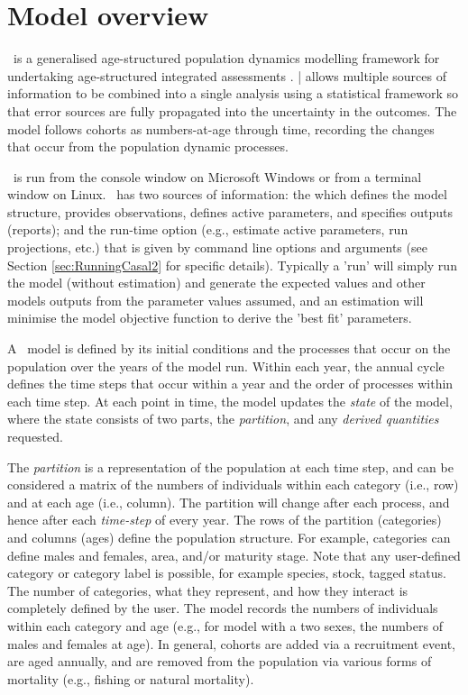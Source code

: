 \section{Model overview\label{sec:Overview}}

\CNAME\ is a generalised age-structured population dynamics modelling framework for undertaking age-structured integrated assessments \citep{Maunder_2013}. \CNAME| allows multiple sources of information to be combined into a single analysis using a statistical framework so that error sources are fully propagated into the uncertainty in the outcomes. The model follows cohorts as numbers-at-age through time, recording the changes that occur from the population dynamic processes.

\CNAME\ is run from the console window on Microsoft Windows or from a terminal window on Linux. \CNAME\ has two sources of information: the \emph{\config} which  defines the model structure, provides observations, defines active parameters, and specifies outputs (reports); and the run-time option (e.g., estimate active parameters, run projections, etc.) that is given by command line options and arguments (see Section \ref{sec:RunningCasal2} for specific details). Typically a 'run' will simply run the model (without estimation) and generate the expected values and other models outputs from the parameter values assumed, and an estimation will minimise the model objective function to derive the 'best fit' parameters.

A \CNAME\ model is defined by its initial conditions and the processes that occur on the population over the years of the model run. Within each year, the annual cycle defines the time steps that occur within a year and the order of processes within each time step. At each point in time, the model updates the \emph{state} of the model, where the state consists of two parts, the \emph{partition}, and any \emph{derived quantities} requested. 

The \emph{partition} is a representation of the population at each time step, and can be considered a matrix of the numbers of individuals within each category (i.e., row) and at each age (i.e., column). The partition will change after each process, and hence after each \emph{time-step} of every year. The rows of the partition (categories) and columns (ages) define the population structure. For example, categories can define males and females, area, and/or maturity stage. Note that any user-defined category or category label is possible, for example species, stock, tagged status. The number of categories, what they represent, and how they interact is completely defined by the user. The model records the numbers of individuals within each category and age (e.g., for model with a two sexes, the numbers of males and females at age). In general, cohorts are added via a recruitment event, are aged annually, and are removed from the population via various forms of mortality (e.g., fishing or natural mortality).

